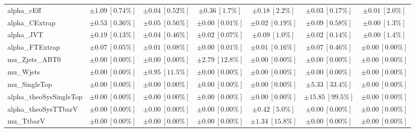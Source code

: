 \begin{sidewaystable}
\begin{center}
\begin{tabular*}{\textwidth}{@{\extracolsep{\fill}}lcccccc}
alpha\_cEff         & $\pm 1.09\ [0.74\%] $          & $\pm 0.04\ [0.52\%] $          & $\pm 0.36\ [1.7\%] $          & $\pm 0.18\ [2.2\%] $          & $\pm 0.03\ [0.17\%] $          & $\pm 0.01\ [2.0\%] $       \\
alpha\_CExtrap         & $\pm 0.53\ [0.36\%] $          & $\pm 0.05\ [0.56\%] $          & $\pm 0.00\ [0.01\%] $          & $\pm 0.02\ [0.19\%] $          & $\pm 0.09\ [0.58\%] $          & $\pm 0.00\ [1.3\%] $       \\
alpha\_JVT         & $\pm 0.19\ [0.13\%] $          & $\pm 0.04\ [0.46\%] $          & $\pm 0.02\ [0.07\%] $          & $\pm 0.09\ [1.0\%] $          & $\pm 0.02\ [0.14\%] $          & $\pm 0.00\ [1.4\%] $       \\
alpha\_FTExtrap         & $\pm 0.07\ [0.05\%] $          & $\pm 0.01\ [0.08\%] $          & $\pm 0.00\ [0.01\%] $          & $\pm 0.01\ [0.16\%] $          & $\pm 0.07\ [0.46\%] $          & $\pm 0.00\ [0.00\%] $       \\
mu\_Zjets\_ABT0         & $\pm 0.00\ [0.00\%] $          & $\pm 0.00\ [0.00\%] $          & $\pm 2.79\ [12.8\%] $          & $\pm 0.00\ [0.00\%] $          & $\pm 0.00\ [0.00\%] $          & $\pm 0.00\ [0.00\%] $       \\
mu\_Wjets         & $\pm 0.00\ [0.00\%] $          & $\pm 0.95\ [11.5\%] $          & $\pm 0.00\ [0.00\%] $          & $\pm 0.00\ [0.00\%] $          & $\pm 0.00\ [0.00\%] $          & $\pm 0.00\ [0.00\%] $       \\
mu\_SingleTop         & $\pm 0.00\ [0.00\%] $          & $\pm 0.00\ [0.00\%] $          & $\pm 0.00\ [0.00\%] $          & $\pm 0.00\ [0.00\%] $          & $\pm 5.33\ [33.4\%] $          & $\pm 0.00\ [0.00\%] $       \\
alpha\_theoSysSingleTop         & $\pm 0.00\ [0.00\%] $          & $\pm 0.00\ [0.00\%] $          & $\pm 0.00\ [0.00\%] $          & $\pm 0.00\ [0.00\%] $          & $\pm 15.85\ [99.5\%] $          & $\pm 0.00\ [0.00\%] $       \\
alpha\_theoSysTTbarV         & $\pm 0.00\ [0.00\%] $          & $\pm 0.00\ [0.00\%] $          & $\pm 0.00\ [0.00\%] $          & $\pm 0.42\ [5.0\%] $          & $\pm 0.00\ [0.00\%] $          & $\pm 0.00\ [0.00\%] $       \\
mu\_TtbarV         & $\pm 0.00\ [0.00\%] $          & $\pm 0.00\ [0.00\%] $          & $\pm 0.00\ [0.00\%] $          & $\pm 1.34\ [15.8\%] $          & $\pm 0.00\ [0.00\%] $          & $\pm 0.00\ [0.00\%] $       \\

\end{tabular*}
\end{center}
\end{sidewaystable}

